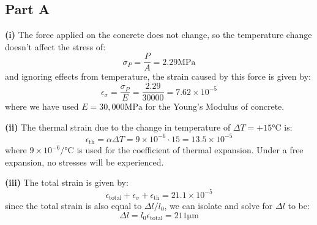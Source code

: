 \documentclass{article}
\begin{document}
\subsection{Part A}
\textbf{(i)} The force applied on the concrete does not change, so the temperature change doesn't affect the stress of:
\begin{equation}
    \sigma_P = \frac{P}{A} = 2.29 \si{\mega\pascal}
    \label{eq:}
\end{equation}
and ignoring effects from temperature, the strain caused by this force is given by:
\begin{equation}
    \epsilon_\sigma = \frac{\sigma_P}{E}=\frac{2.29}{30000} = 7.62 \times 10^{-5}
    \label{eq:}
\end{equation}
where we have used $E=30,000\si{\mega\pascal}$ for the Young's Modulus of concrete.

\textbf{(ii)} The thermal strain due to the change in temperature of $\Delta T = +15\si{\celsius}$ is:
\begin{equation}
    \epsilon_\text{th}=\alpha \Delta T = 9 \times 10^{-6} \cdot 15 = 13.5 \times 10^{-5}
\end{equation}
where $9 \times 10^{-6} \si{\per\celsius}$ is used for the coefficient of thermal expansion. Under a free expansion, no stresses will be experienced.

\textbf{(iii)} The total strain is given by:
\begin{equation}
    \epsilon_\text{total}+\epsilon_\sigma+\epsilon_\text{th} = 21.1 \times 10^{-5}
    \label{eq:}
\end{equation}
since the total strain is also equal to $\Delta l/l_0$, we can isolate and solve for $\Delta l$ to be:
\begin{equation}
    \Delta l = l_0\epsilon_\text{total} = 211\si{\micro\meter}
    \label{eq:}
\end{equation}
\end{document}
